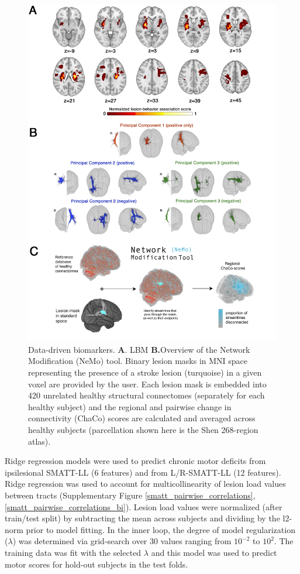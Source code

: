 \documentclass[10pt]{article}
\begin{document}
\begin{figure}[htp]
\centering
\includegraphics[width=0.9\linewidth]{figures/data_driven.png}
\caption{Data-driven biomarkers. \textbf{A}. LBM \textbf{B.}Overview of the Network Modification (NeMo) tool. Binary lesion masks in MNI space representing the presence of a stroke lesion (turquoise) in a given voxel are provided by the user. Each lesion mask is embedded into 420 unrelated healthy structural connectomes (separately for each healthy subject) and the regional and pairwise change in connectivity (ChaCo) scores are calculated and averaged across healthy subjects (parcellation shown here is the Shen 268-region atlas). }
\label{M1}
\end{figure}




Ridge regression models were used to predict chronic motor deficits from ipsilesional SMATT-LL (6 features) and from L/R-SMATT-LL (12 features). Ridge regression was used to account for multicollinearity of lesion load values between tracts (Supplementary Figure \ref{smatt_pairwise_correlations}, \ref{smatt_pairwise_correlations_bi}). Lesion load values were normalized (after train/test split) by subtracting the mean across subjects and dividing by the l2-norm prior to model fitting. In the inner loop, the degree of model regularization  ($\lambda$) was determined via grid-search over 30 values ranging from $10^{-2}$ to $10^2$. The training data was fit with the selected $\lambda$ and this model was used to predict motor scores for hold-out subjects in the test folds.
\end{document}
